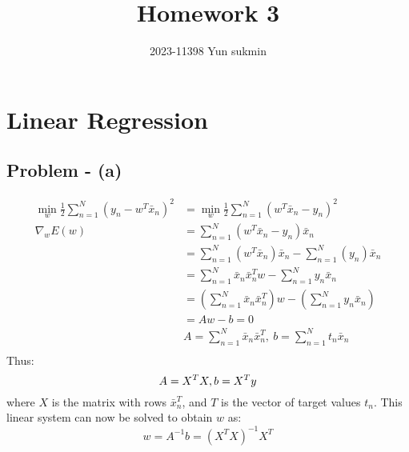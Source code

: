 \documentclass{article}
\title{Homework 3}
\author{2023-11398 Yun sukmin}
\begin{document}
\maketitle
\section{Linear Regression}
\subsection{Problem - (a)}
\[
\begin{aligned}
    \min_{w} \frac{1}{2} \sum_{n=1}^{N} (y_{n} - w^{T}\bar{x}_{n})^{2} &= \min_{w} \frac{1}{2} \sum_{n=1}^{N} (w^{T}\bar{x}_{n} - y_{n})^{2} \\
    \nabla_{w} E(w) &= \sum_{n=1}^{N} (w^{T}\bar{x}_{n} - y_{n})\bar{x}_{n} \\
    &= \sum_{n=1}^{N} (w^{T}\bar{x}_{n})\bar{x}_{n} - \sum_{n=1}^{N} (y_{n})\bar{x}_{n} \\
    &= \sum_{n=1}^{N} \bar{x}_{n}\bar{x}_{n}^{T}w - \sum_{n=1}^{N} y_{n}\bar{x}_{n} \\
    &= \left(\sum_{n=1}^{N} \bar{x}_{n}\bar{x}_{n}^{T}\right)w - \left(\sum_{n=1}^{N} y_{n}\bar{x}_{n}\right) \\
    &= Aw - b = 0 \\
    &A=\sum_{n=1}^{N} \bar{x}_{n}\bar{x}_{n}^{T}, \ b=\sum_{n=1}^{N} t_{n}\bar{x}_{n} \\
\end{aligned}
\]
Thus: \\
\[
    A=X^{T}X,  b=X^{T}y \\
\]
where \( X \) is the matrix with rows \( \bar{x}_{n}^{T} \), and \( T \) is the vector of target values \( t_{n} \). This linear system can now be solved to obtain \( w \) as:
\[
    w = A^{-1}b = (X^{T}X)^{-1}X^{T}
\]
\end{document}
